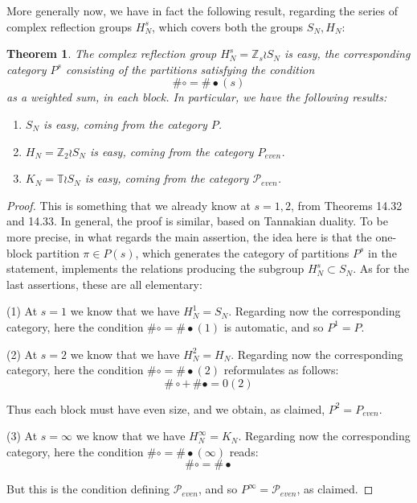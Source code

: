 \documentclass[12pt]{amsbook}
\newtheorem{theorem}{Theorem}[chapter]
\begin{document}
More generally now, we have in fact the following result, regarding the series of complex reflection groups $H_N^s$, which covers both the groups $S_N,H_N$:

\begin{theorem}
The complex reflection group $H_N^s=\mathbb Z_s\wr S_N$ is easy, the corresponding category $P^s$ consisting of the partitions satisfying the condition
$$\#\circ=\#\bullet(s)$$
as a weighted sum, in each block. In particular, we have the following results:
\begin{enumerate}
\item $S_N$ is easy, coming from the category $P$.

\item $H_N=\mathbb Z_2\wr S_N$ is easy, coming from the category $P_{even}$.

\item $K_N=\mathbb T\wr S_N$ is easy, coming from the category $\mathcal P_{even}$.
\end{enumerate}
\end{theorem}

\begin{proof}
This is something that we already know at $s=1,2$, from Theorems 14.32 and 14.33. In general, the proof is similar, based on Tannakian duality. To be more precise, in what regards the main assertion, the idea here is that the one-block partition $\pi\in P(s)$, which generates the category of partitions $P^s$ in the statement, implements the relations producing the subgroup $H_N^s\subset S_N$. As for the last assertions, these are all elementary:

\medskip

(1) At $s=1$ we know that we have $H_N^1=S_N$. Regarding now the corresponding category, here the condition $\#\circ=\#\bullet(1)$ is automatic, and so $P^1=P$.

\medskip

(2) At $s=2$ we know that we have $H_N^2=H_N$. Regarding now the corresponding category, here the condition $\#\circ=\#\bullet(2)$ reformulates as follows:
$$\#\circ+\,\#\bullet=0(2)$$

Thus each block must have even size, and we obtain, as claimed, $P^2=P_{even}$.

\medskip

(3) At $s=\infty$ we know that we have $H_N^\infty=K_N$. Regarding now the corresponding category, here the condition $\#\circ=\#\bullet(\infty)$ reads:
$$\#\circ=\#\bullet$$

But this is the condition defining $\mathcal P_{even}$, and so $P^\infty=\mathcal P_{even}$, as claimed.
\end{proof}
\end{document}
